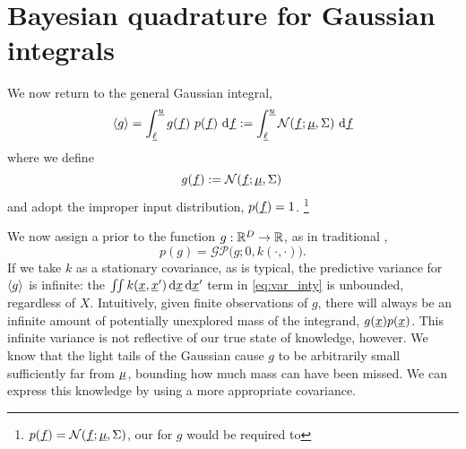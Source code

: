 \documentclass[twoside]{article}
\begin{document}
\section{Bayesian quadrature for Gaussian integrals}

We now return to the general Gaussian integral,
\begin{equation}
 \langle g \rangle=\int_{\underline{\smash{\ell}}}^{\underline{\smash{u}}} g(\underline{\smash{f}})~p(\underline{\smash{f}})~\mathrm{d} \underline{\smash{f}}:= \int_{\underline{\smash{\ell}}}^{\underline{\smash{u}}} \mathcal{N}(\underline{\smash{f}};\underline{\smash{\mu}},\Sigma)~\mathrm{d} \underline{\smash{f}}
\end{equation}
where we define
\begin{equation}
 g(\underline{\smash{f}}) := \mathcal{N}(\underline{\smash{f}};\underline{\smash{\mu}},\Sigma)\,
\end{equation}
and adopt the improper input distribution, $p(\underline{\smash{f}}) = 1$.%
\footnote{
 $p(\underline{\smash{f}}) = \mathcal{N}(\underline{\smash{f}};\underline{\smash{\mu}},\Sigma)$, our \gp for $g$ would be required to 
}

We now assign a \gp prior 
to the function $g: \mathbb{R}^D \to \mathbb{R}$, as in traditional \bq,
\begin{equation}
 p(g) = \mathcal{GP}\bigl(g; 0 , k(\cdot,\cdot)\bigr).
\end{equation}
 If we take $k$ as a stationary covariance, as is typical, the predictive variance for $\langle g \rangle$ is infinite: the $\iint k(\underline{\smash{x}},\underline{\smash{x}}')\,\mathrm{d}\underline{\smash{x}}\,\mathrm{d} \underline{\smash{x}}'$ term in \eqref{eq:var_inty} is unbounded, regardless of $X$. Intuitively, given finite observations of $g$, there will always be an infinite amount of potentially unexplored mass of the integrand, $g(\underline{\smash{x}})p(\underline{\smash{x}})$. This infinite variance is not reflective of our true state of knowledge, however. We know that the light tails of the Gaussian cause $g$ to be arbitrarily small sufficiently far from $\underline{\smash{\mu}}$, bounding how much mass can have been missed. We can express this knowledge by using a more appropriate covariance. 
\end{document}
